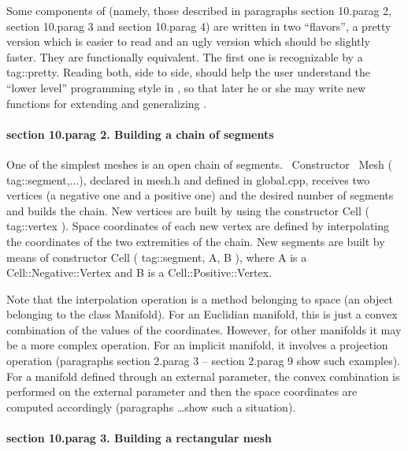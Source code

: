 {Some components of {\maniFEM} (namely, those described in paragraphs \numb section 10.\numb parag 2,
\numb section 10.\numb parag 3 and \numb section 10.\numb parag 4) are written in two ``flavors'',
a pretty version which is easier
to read and an ugly version which should be slightly faster.
They are functionally equivalent.
The first one is recognizable by a {\codett tag::pretty}.
Reading both, side to side, should help the user understand the ``lower level'' programming style
in {\maniFEM}, so that later he or she may write new functions for extending and generalizing
{\maniFEM}.


\paragraph{\numb section 10.\numb parag 2. Building a chain of segments}

One of the simplest meshes is an open chain of segments.
\ Constructor \ {\codett Mesh ( tag::segment,...)}, declared in {\codett mesh.h} and defined in
{\codett global.cpp}, receives two vertices (a negative one and a positive one)
and the desired number of segments and builds the chain.
New vertices are built by using the constructor {\codett Cell ( tag::vertex )}.
Space coordinates of each new vertex are defined by interpolating the coordinates of the
two extremities of the chain.
New segments are built by means of constructor {\codett Cell ( tag::segment, A, B )},
where {\codett A} is a {\codett Cell::Negative::Vertex} and {\codett B} is a
{\codett Cell::Positive::Vertex}.

Note that the interpolation operation is a method belonging to {\codett space}
(an object belonging to the class {\codett Manifold}).
For an Euclidian manifold, this is just a convex combination of the values of the coordinates.
However, for other manifolds it may be a more complex operation.
For an implicit manifold, it involves a projection operation
(paragraphs \numb section 2.\numb parag 3 -- \numb section 2.\numb parag 9 show such examples).
For a manifold defined through an external parameter, the convex combination is performed on
the external parameter and then the space coordinates are computed accordingly (paragraphs
\dots show such a situation).


\paragraph{\numb section 10.\numb parag 3. Building a rectangular mesh}

}
